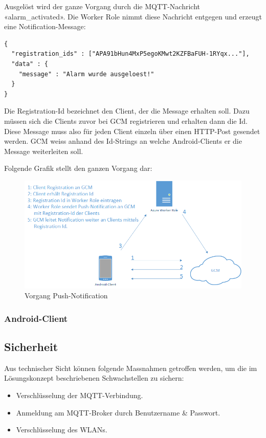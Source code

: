 Ausgelöst wird der ganze Vorgang durch die MQTT-Nachricht «alarm\_activated». Die Worker Role nimmt diese Nachricht entgegen und erzeugt eine Notification-Message:

\begin{lstlisting}[style=csharp, caption=Notification.cs - Notification Message]
{
  "registration_ids" : ["APA91bHun4MxP5egoKMwt2KZFBaFUH-1RYqx..."],
  "data" : {
  	"message" : "Alarm wurde ausgeloest!"
  }
}
\end{lstlisting}

Die Registration-Id bezeichnet den Client, der die Message erhalten soll. Dazu müssen sich die Clients zuvor bei GCM registrieren und erhalten dann die Id. Diese Message muss also für jeden Client einzeln über einen HTTP-Post gesendet werden. GCM weiss anhand des Id-Strings an welche Android-Clients er die Message weiterleiten soll.

Folgende Grafik stellt den ganzen Vorgang dar:
\begin{figure}[h!]
	\centering
		\includegraphics[scale=0.7]{report/img/gcm}
	\caption{Vorgang Push-Notification}
	\label{fig:deploymentAzure}
\end{figure}

\subsubsection{Android-Client}


\subsection{Sicherheit}
Aus technischer Sicht können folgende Massnahmen getroffen werden, um die im Lösungskonzept beschriebenen Schwachstellen zu sichern:
\begin{itemize}
	\item Verschlüsselung der MQTT-Verbindung.
	\item Anmeldung am MQTT-Broker durch Benutzername \& Passwort.
	\item Verschlüsselung des WLANs.
\end{itemize}

